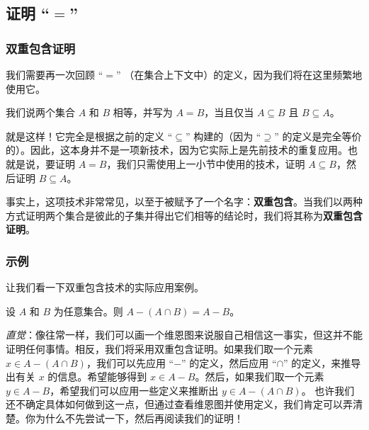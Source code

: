 \subsection{证明 ``$=$''}

\subsubsection*{双重包含证明}

我们需要再一次回顾 ``$=$'' （在集合上下文中）的定义，因为我们将在这里频繁地使用它。

\begin{definition}
    我们说两个集合 $A$ 和 $B$ 相等，并写为 $A = B$，当且仅当 $A \subseteq B$ 且 $B \subseteq A$。
\end{definition}

就是这样！它完全是根据之前的定义 ``$\subseteq$'' 构建的（因为 ``$\supseteq$'' 的定义是完全等价的）。因此，这本身并不是一项新技术，因为它实际上是先前技术的重复应用。也就是说，要证明 $A = B$，我们只需使用上一小节中使用的技术，证明 $A \subseteq B$，然后证明 $B \subseteq A$。

事实上，这项技术非常常见，以至于被赋予了一个名字：\textbf{双重包含}。当我们以两种方式证明两个集合是彼此的子集并得出它们相等的结论时，我们将其称为\textbf{双重包含证明}。

\subsubsection*{示例}

让我们看一下双重包含技术的实际应用案例。

\begin{lemma}
    设 $A$ 和 $B$ 为任意集合。则 $A - (A \cap B) = A - B$。
\end{lemma}

\emph{直觉}：像往常一样，我们可以画一个维恩图来说服自己相信这一事实，但这并不能证明任何事情。相反，我们将采用双重包含证明。如果我们取一个元素 $x \in A - (A \cap B)$，我们可以先应用 ``$-$'' 的定义，然后应用 ``$\cap$'' 的定义，来推导出有关 $x$ 的信息。希望能够得到 $x \in A - B$。然后，如果我们取一个元素 $y \in A - B$，希望我们可以应用一些定义来推断出 $y \in A - (A \cap B)$。 也许我们还不确定具体如何做到这一点，但通过查看维恩图并使用定义，我们肯定可以弄清楚。你为什么不先尝试一下，然后再阅读我们的证明！

